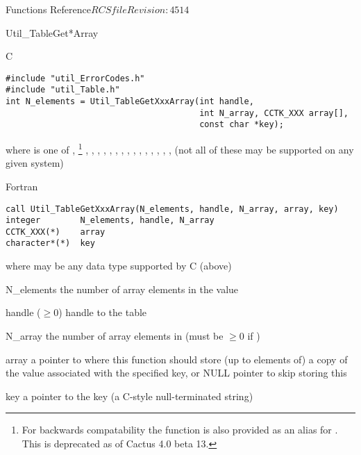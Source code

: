 \begin{cactuspart}{ Functions Reference}{$RCSfile$}{$Revision: 4514 $}
\begin{FunctionDescription}{Util\_TableGet*Array}
\begin{SynopsisSection}
\begin{Synopsis}{C}
\begin{verbatim}
#include "util_ErrorCodes.h"
#include "util_Table.h"
int N_elements = Util_TableGetXxxArray(int handle,
                                       int N_array, CCTK_XXX array[],
                                       const char *key);
\end{verbatim}
where  is one of
   , %
\footnote{%
	 For backwards compatability the function
	  is also provided
	 as an alias for .
	 This is deprecated as of Cactus 4.0 beta 13.
	 }%
,
   , ,
   , , , , ,
   , , , ,
   , , , 
(not all of these may be supported on any given system)
\end{Synopsis}
\begin{Synopsis}{Fortran}
\begin{verbatim}
call Util_TableGetXxxArray(N_elements, handle, N_array, array, key)
integer        N_elements, handle, N_array
CCTK_XXX(*)    array
character*(*)  key
\end{verbatim}
where  may be any data type supported by C (above)
\end{Synopsis}
\end{SynopsisSection}

\begin{ResultSection}
\begin{Result}{N\_elements}
the number of array elements in the value
\end{Result}
\end{ResultSection}

\begin{ParameterSection}
\begin{Parameter}{handle ($\ge 0$)}
handle to the table
\end{Parameter}
\begin{Parameter}{N\_array}
the number of array elements in 
(must be $\ge 0$ if )
\end{Parameter}
\begin{Parameter}{array}
a pointer to where this function should store (up to 
elements of) a copy of the value associated with the specified key,
or NULL pointer to skip storing this
\end{Parameter}
\begin{Parameter}{key}
a pointer to the key (a C-style null-terminated string)
\end{Parameter}
\end{ParameterSection}


\end{FunctionDescription}
\end{cactuspart}
